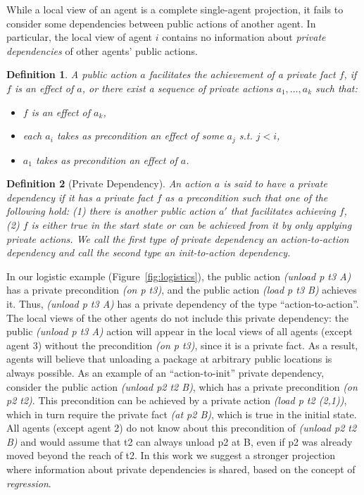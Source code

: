 \documentclass[letterpaper]{article}
\newtheorem{definition}{Definition}
\theoremstyle{definition}
\begin{document}
While a local view of an agent is a complete single-agent projection, it fails to consider some dependencies between public actions of another agent. In particular, the local view of agent $i$ contains no information about {\em private dependencies} of other agents' public actions. %


\begin{definition}
A public action $a$ {\em facilitates} the achievement of a private fact $f$, if $f$ is an effect of $a$, or there exist a sequence of private actions $a_1,...,a_k$ such that:
\begin{itemize}
\item $f$ is an effect of $a_k$,
\item each $a_i$ takes as precondition an effect of some $a_j$ s.t. $j<i$,
\item $a_1$ takes as precondition an effect of $a$.
\end{itemize}
\end{definition}

\begin{definition}[Private Dependency]
An action $a$ is said to have a private dependency if it has a private fact $f$ as a precondition such that one of the following hold: (1) there is another public action $a'$ that facilitates achieving $f$,  (2) $f$ is either true in the start state or can be achieved from it by only applying private actions. We call the first type of private dependency an action-to-action dependency and call the second type an init-to-action dependency.
\label{def:private-dependency}
\end{definition}


In our logistic example (Figure~\ref{fig:logistics}), the public action {\em (unload p t3 A)} has a private precondition {\em (on p t3)},
and the public action {\em (load p t3 B)} achieves it. Thus, {\em (unload p t3 A)} has a private dependency of the type ``action-to-action''.
The local views of the other agents do not include this private dependency: the public {\em (unload p t3 A)} action
will appear in the local views of all agents (except agent 3) without the precondition {\em (on p t3)}, since it is a private fact. As a result, agents will believe that unloading a package at arbitrary public locations is always possible.
As an example of an ``action-to-init'' private dependency, consider the public action {\em (unload p2 t2 B)}, which has a private precondition
{\em (on p2 t2)}. This precondition can be achieved by a private action {\em (load p t2 (2,1))}, which in turn require the private fact {\em (at p2 B)}, which is true in the initial state. All agents (except agent 2) do not know about this precondition of {\em (unload p2 t2 B)} and would assume that t2 can always unload p2 at B, even if p2 was already moved beyond the reach of t2.
In this work we suggest a stronger projection where information about private dependencies is shared, based on the concept of {\em regression}. %
\end{document}
